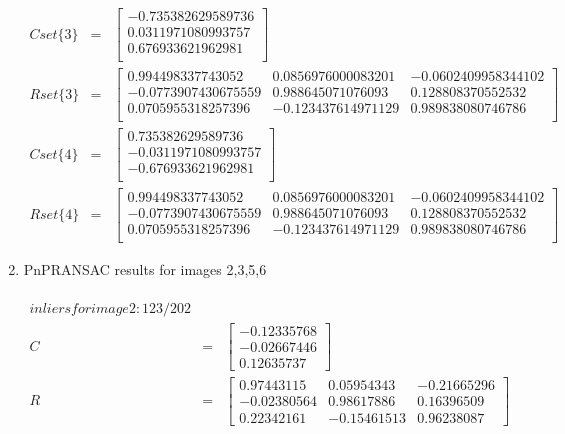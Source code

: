 \documentclass[10pt,letterpaper]{article}
\begin{document}
\begin{enumerate}[]
\begin{eqnarray*}
Cset\{3\} &=&
\begin{bmatrix}
        -0.735382629589736 \\
        0.0311971080993757 \\
         0.676933621962981 \\
\end{bmatrix} \\
Rset\{3\} &=&
\begin{bmatrix}
         0.994498337743052    &    0.0856976000083201    &   -0.0602409958344102 \\
       -0.0773907430675559  &       0.988645071076093    &     0.128808370552532 \\
        0.0705955318257396   &     -0.123437614971129    &     0.989838080746786 \\
\end{bmatrix} \\
Cset\{4\} &=&
\begin{bmatrix}
         0.735382629589736 \\
       -0.0311971080993757 \\
        -0.676933621962981 \\
\end{bmatrix} \\
Rset\{4\} &=&
\begin{bmatrix}
         0.994498337743052     &   0.0856976000083201    &   -0.0602409958344102 \\
       -0.0773907430675559    &     0.988645071076093     &    0.128808370552532 \\
        0.0705955318257396     &   -0.123437614971129     &    0.989838080746786 \\
\end{bmatrix}
\end{eqnarray*}

\newpage 

\item PnPRANSAC results for images 2,3,5,6

\begin{eqnarray*}

\\ inliers for image 2: 123 / 202 \\

C &=& 
\begin{bmatrix}
-0.12335768 \\
-0.02667446 \\
0.12635737   
\end{bmatrix} \\ 
R &=& 
\begin{bmatrix}
0.97443115 & 0.05954343 & -0.21665296 \\
-0.02380564 & 0.98617886 & 0.16396509 \\
0.22342161 & -0.15461513 & 0.96238087   
\end{bmatrix} \\


\end{eqnarray*}
\end{enumerate}
\end{document}
